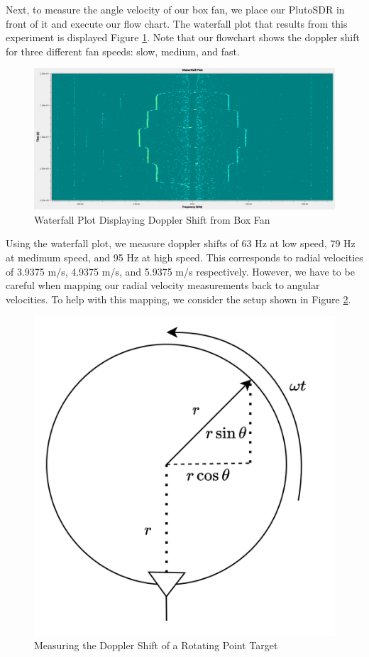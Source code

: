 \documentclass{article}
\begin{document}


Next, to measure the angle velocity of our box fan, we place our PlutoSDR in front of it and execute our flow chart. The waterfall plot that results from this experiment is displayed Figure \ref{fig::dopp_spectrum}. Note that our flowchart shows the doppler shift for three different fan speeds: slow, medium, and fast.

\begin{figure}[H]
    	\centering
    \includegraphics[width=0.9\linewidth]{dopp_spectrum2.png}
    	\caption{Waterfall Plot Displaying Doppler Shift from Box Fan}
    	\label{fig::dopp_spectrum}
\end{figure}

\noindent Using the waterfall plot, we measure doppler shifts of 63 Hz at low speed, 79 Hz at medimum speed, and 95 Hz at high speed. This corresponds to radial velocities of 3.9375 m/s, 4.9375 m/s, and 5.9375 m/s respectively. However, we have to be careful when mapping our radial velocity measurements back to angular velocities. To help with this mapping, we consider the setup shown in Figure \ref{fig::angular_velocity_measurement}. 
\begin{figure}[H]
    	\centering
    \includegraphics[width=0.4\linewidth]{angular_velocity_measurement.png}
    	\caption{Measuring the Doppler Shift of a Rotating Point Target}
    	\label{fig::angular_velocity_measurement}
\end{figure}
\end{document}
